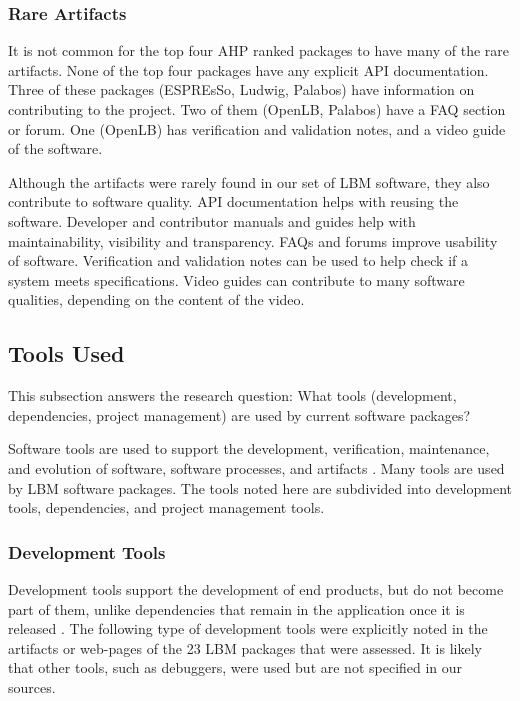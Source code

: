 \documentclass[12pt, notitlepage]{article}
\begin{document}
\subsubsection{Rare Artifacts}
It is not common for the top four AHP ranked packages to have many of the rare artifacts. None of the top four packages have any explicit API documentation. Three of these packages (ESPREsSo, Ludwig, Palabos) have information on contributing to the project. Two of them (OpenLB, Palabos) have a FAQ section or forum. One (OpenLB) has verification and validation notes, and a video guide of the software. 

Although the artifacts were rarely found in our set of LBM software, they also contribute to software quality. API documentation helps with reusing the software. Developer and contributor manuals and guides help with maintainability, visibility and transparency. FAQs and forums improve usability of software. Verification and validation notes can be used to help check if a system meets specifications. Video guides can contribute to many software qualities, depending on the content of the video. 

\subsection{Tools Used}\label{tools}

This subsection answers the research question: What tools (development, dependencies, project management) are used by current software packages?

Software tools are used to support the development, verification, maintenance, and evolution of software, software processes, and artifacts \citep{ghezzi1991fundamentals}. Many tools are used by LBM software packages. The tools noted here are subdivided into development tools, dependencies, and project management tools.

\subsubsection{Development Tools}

Development tools support the development of end products, but do not become part of them, unlike dependencies that remain in the application once it is released \citep{ghezzi1991fundamentals}. The following type of development tools were explicitly noted in the artifacts or web-pages of the 23 LBM packages that were assessed. It is likely that other tools, such as debuggers, were used but are not specified in our sources.
\end{document}
